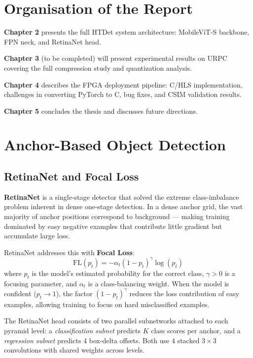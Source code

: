 \section{Organisation of the Report}

\textbf{Chapter 2} presents the full HTDet system architecture: MobileViT-S backbone, FPN neck, and RetinaNet head.

\textbf{Chapter 3} (to be completed) will present experimental results on URPC covering the full compression study and quantization analysis.

\textbf{Chapter 4} describes the FPGA deployment pipeline: C/HLS implementation, challenges in converting PyTorch to C, bug fixes, and CSIM validation results.

\textbf{Chapter 5} concludes the thesis and discusses future directions.

\section{Anchor-Based Object Detection}

\subsection{RetinaNet and Focal Loss}

\textbf{RetinaNet} \cite{ref1} is a single-stage detector that solved the extreme class-imbalance problem inherent in dense one-stage detection. In a dense anchor grid, the vast majority of anchor positions correspond to background — making training dominated by easy negative examples that contribute little gradient but accumulate large loss.

RetinaNet addresses this with \textbf{Focal Loss}:
\[
\text{FL}(p_t) = -\alpha_t (1 - p_t)^\gamma \log(p_t)
\]
where $p_t$ is the model's estimated probability for the correct class, $\gamma > 0$ is a focusing parameter, and $\alpha_t$ is a class-balancing weight. When the model is confident ($p_t \rightarrow 1$), the factor $(1-p_t)^\gamma$ reduces the loss contribution of easy examples, allowing training to focus on hard misclassified examples.

The RetinaNet head consists of two parallel subnetworks attached to each pyramid level: a \textit{classification subnet} predicts $K$ class scores per anchor, and a \textit{regression subnet} predicts 4 box-delta offsets. Both use 4 stacked $3\times3$ convolutions with shared weights across levels.

